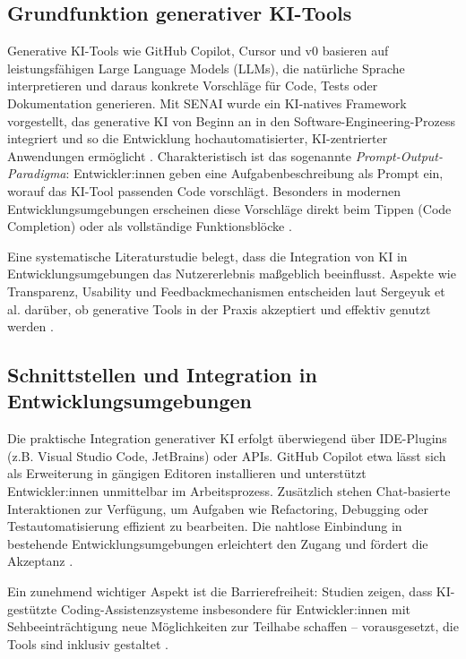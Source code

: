 \label{sec:generative-ki-tools}

\subsection{Grundfunktion generativer KI-Tools}

Generative KI-Tools wie GitHub Copilot, Cursor und v0 basieren auf
leistungsfähigen Large Language Models (LLMs), die natürliche Sprache
interpretieren und daraus konkrete Vorschläge für Code, Tests oder
Dokumentation generieren. Mit SENAI wurde ein KI-natives Framework vorgestellt,
das generative KI von Beginn an in den Software-Engineering-Prozess integriert
und so die Entwicklung hochautomatisierter, KI-zentrierter Anwendungen
ermöglicht \cite{saad_senai_2025}. Charakteristisch ist das sogenannte
\textit{Prompt-Output-Paradigma}: Entwickler:innen geben eine
Aufgabenbeschreibung als Prompt ein, worauf das KI-Tool passenden Code
vorschlägt. Besonders in modernen Entwicklungsumgebungen erscheinen diese
Vorschläge direkt beim Tippen (Code Completion) oder als vollständige
Funktionsblöcke \cite{kerr_github_nodate,weisz_design_2024}.

Eine systematische Literaturstudie belegt, dass die Integration von KI in
Entwicklungsumgebungen das Nutzererlebnis maßgeblich beeinflusst. Aspekte wie
Transparenz, Usability und Feedbackmechanismen entscheiden laut Sergeyuk et al.
darüber, ob generative Tools in der Praxis akzeptiert und effektiv genutzt
werden \cite{sergeyuk_human-ai_2025}.

\subsection{Schnittstellen und Integration in Entwicklungsumgebungen}

Die praktische Integration generativer KI erfolgt überwiegend über IDE-Plugins
(z.B. Visual Studio Code, JetBrains) oder APIs. GitHub Copilot etwa lässt sich
als Erweiterung in gängigen Editoren installieren und unterstützt
Entwickler:innen unmittelbar im Arbeitsprozess. Zusätzlich stehen Chat-basierte
Interaktionen zur Verfügung, um Aufgaben wie Refactoring, Debugging oder
Testautomatisierung effizient zu bearbeiten. Die nahtlose Einbindung in
bestehende Entwicklungsumgebungen erleichtert den Zugang und fördert die
Akzeptanz \cite{kerr_github_nodate,shi_ai-assisted_2023,weisz_design_2024}.

Ein zunehmend wichtiger Aspekt ist die Barrierefreiheit: Studien zeigen, dass
KI-gestützte Coding-Assistenzsysteme insbesondere für Entwickler:innen mit
Sehbeeinträchtigung neue Möglichkeiten zur Teilhabe schaffen – vorausgesetzt,
die Tools sind inklusiv gestaltet \cite{flores-saviaga_impact_2025}.

